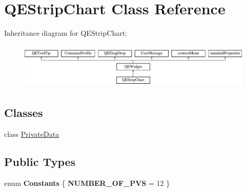 \hypertarget{classQEStripChart}{
\section{QEStripChart Class Reference}
\label{classQEStripChart}
}
Inheritance diagram for QEStripChart:\begin{figure}[H]
\begin{center}
\leavevmode
\includegraphics[height=2.204725cm]{classQEStripChart}
\end{center}
\end{figure}
\subsection*{Classes}
\begin{DoxyCompactItemize}
\item 
class \hyperlink{classQEStripChart_1_1PrivateData}{PrivateData}
\end{DoxyCompactItemize}
\subsection*{Public Types}
\begin{DoxyCompactItemize}
\item 
enum {\bfseries Constants} \{ {\bfseries NUMBER\_\-OF\_\-PVS} =  12
 \}
\end{DoxyCompactItemize}
